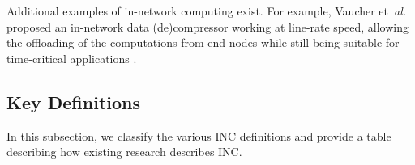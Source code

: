 Additional examples of in-network computing exist. For example, Vaucher et~\textit{al.} proposed an in-network data (de)compressor working at line-rate speed, allowing the offloading of the computations from end-nodes while still being suitable for time-critical applications \cite{10.11453386367.3431302}.  

\subsection{Key Definitions}
\noindent In this subsection, we classify the various INC definitions and provide a table describing how existing research describes INC.
